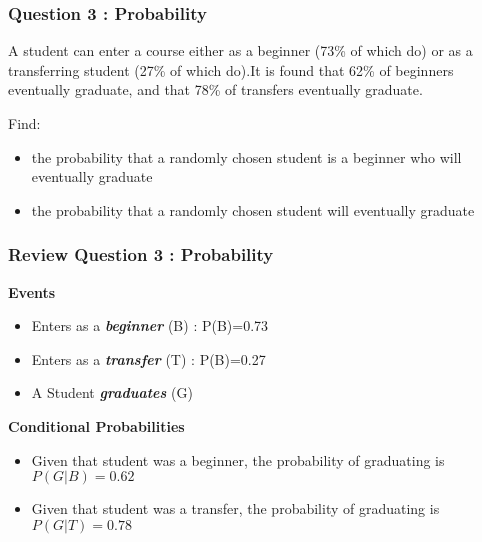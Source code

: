 \begin{frame}
\frametitle{Question 3 :  Probability}
A student can enter a course either as a beginner (73\% of which do) or as a transferring
student (27\% of which do).It is found that 62\% of beginners eventually graduate, and that
78\% of transfers eventually graduate.


Find:
\begin{itemize}
\item the probability that a randomly chosen student is a beginner who will
eventually graduate
\item the probability that a randomly chosen student will eventually graduate
\end{itemize}
\end{frame}
\begin{frame}
\frametitle{Review Question 3 :  Probability}
\textbf{Events}

\begin{itemize}
\item Enters as a \textbf{\emph{beginner}} (B) : P(B)=0.73
\item Enters as a \textbf{\emph{transfer}} (T) : P(B)=0.27
\item A Student \textbf{\emph{graduates}} (G)
\end{itemize}
\textbf{Conditional Probabilities}
\begin{itemize}
\item Given that student was a beginner, the probability of graduating is $P(G|B) = 0.62$
\item Given that student was a transfer, the probability of graduating is $P(G|T) = 0.78$
\end{itemize}
\end{frame}
